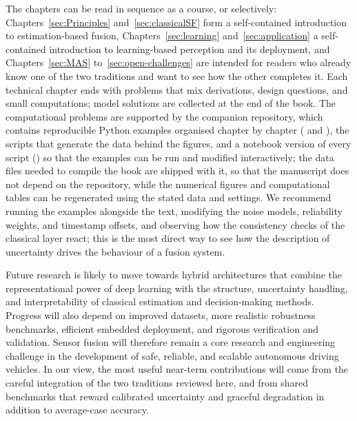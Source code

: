 The chapters can be read in sequence as a course, or selectively: Chapters~\ref{sec:Principles} and~\ref{sec:classicalSF} form a self-contained introduction to estimation-based fusion, Chapters~\ref{sec:learning} and~\ref{sec:application} a self-contained introduction to learning-based perception and its deployment, and Chapters~\ref{sec:MAS} to~\ref{sec:open-challenges} are intended for readers who already know one of the two traditions and want to see how the other completes it. Each technical chapter ends with problems that mix derivations, design questions, and small computations; model solutions are collected at the end of the book. The computational problems are supported by the companion repository, which contains reproducible Python examples organised chapter by chapter ( and ), the scripts that generate the data behind the figures, and a notebook version of every script () so that the examples can be run and modified interactively; the data files needed to compile the book are shipped with it, so that the manuscript does not depend on the repository, while the numerical figures and computational tables can be regenerated using the stated data and settings. We recommend running the examples alongside the text, modifying the noise models, reliability weights, and timestamp offsets, and observing how the consistency checks of the classical layer react; this is the most direct way to see how the description of uncertainty drives the behaviour of a fusion system.

Future research is likely to move towards hybrid architectures that combine the representational power of deep learning with the structure, uncertainty handling, and interpretability of classical estimation and decision-making methods. Progress will also depend on improved datasets, more realistic robustness benchmarks, efficient embedded deployment, and rigorous verification and validation. Sensor fusion will therefore remain a core research and engineering challenge in the development of safe, reliable, and scalable autonomous driving vehicles. %
In our view, the most useful near-term contributions will come from the careful integration of the two traditions reviewed here, and from shared benchmarks that reward calibrated uncertainty and graceful degradation in addition to average-case accuracy.
